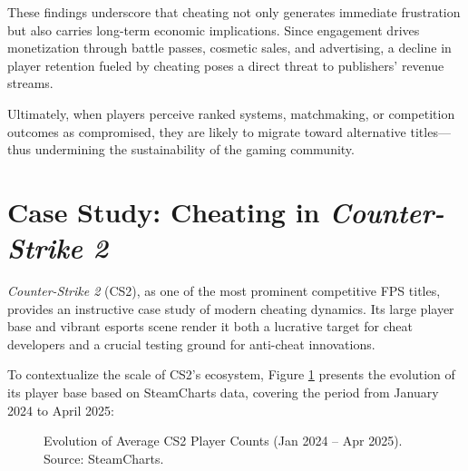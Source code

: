 These findings underscore that cheating not only generates immediate frustration but also carries long-term economic implications.  
Since engagement drives monetization through battle passes, cosmetic sales, and advertising, a decline in player retention fueled by cheating poses a direct threat to publishers’ revenue streams.

Ultimately, when players perceive ranked systems, matchmaking, or competition outcomes as compromised, they are likely to migrate toward alternative titles—thus undermining the sustainability of the gaming community.

\section{Case Study: Cheating in \textit{Counter-Strike 2}}

\textit{Counter-Strike 2} (CS2), as one of the most prominent competitive FPS titles, provides an instructive case study of modern cheating dynamics.  
Its large player base and vibrant esports scene render it both a lucrative target for cheat developers and a crucial testing ground for anti-cheat innovations.

To contextualize the scale of CS2’s ecosystem, Figure \ref{fig:cs2-playerbase} presents the evolution of its player base based on SteamCharts data, covering the period from January 2024 to April 2025:

\begin{figure}[H]
  \centering
  \caption{Evolution of Average CS2 Player Counts (Jan 2024 -- Apr 2025). Source: SteamCharts.}
  \label{fig:cs2-playerbase}
\end{figure}

